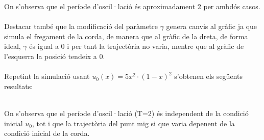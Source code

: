 \documentclass[a4paper, 11pt]{article}
\begin{document}
On s'observa que el període d'oscil·lació és aproximadament 2 per ambdós casos.\\\\
Destacar també que la modificació del paràmetre $\gamma$ genera canvis al gràfic ja que simula el fregament de la corda, de manera que al gràfic de la dreta, de forma ideal, $\gamma$ és igual a 0 i per tant la trajectòria no varia, mentre que al gràfic de l'esquerra la posició tendeix a 0.\\\\
Repetint la simulació usant $u_{0}(x) = 5x^{2} \cdot (1-x)^{2}$ s'obtenen els següents resultats:
\vspace{-1.8em}
\begin{figure}[h]
\captionsetup[subfigure]{labelformat=empty}
\centering
\end{figure}\\
On s'observa que el període d'oscil·lació (T=2) és independent de la condició inicial $u_{0}$, tot i que la trajectòria del punt mig si que varia depenent de la condició inicial de la corda.

\newpage
\end{document}
